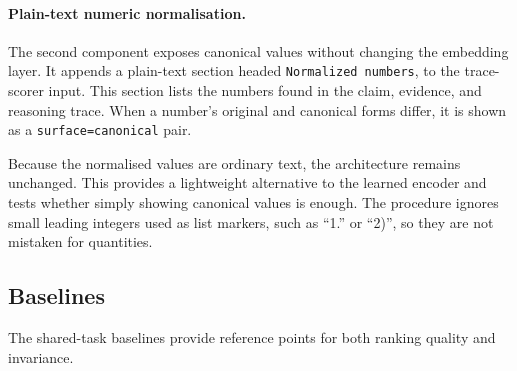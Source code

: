 \paragraph{Plain-text numeric normalisation.}
The second component exposes canonical values without changing the embedding layer. It appends a
plain-text section headed
\texttt{Normalized numbers}, to the trace-scorer input. This section lists the numbers found in the
claim, evidence, and reasoning trace. When a number's original and canonical forms differ, it is
shown as a \texttt{surface=canonical} pair.

Because the normalised values are ordinary text, the architecture remains unchanged. This provides a
lightweight alternative to the learned encoder and tests whether simply showing canonical values is
enough. The procedure ignores small leading integers used as list markers, such as ``1.'' or ``2)'',
so they are not mistaken for quantities.

\subsection{Baselines}
\label{subsec:method-baselines}

The shared-task baselines provide reference points for both ranking quality and invariance.


